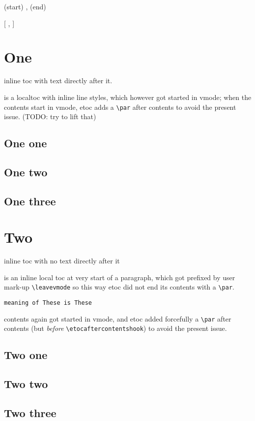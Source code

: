 \documentclass{article}
\begin{document}
  {(start) \etocskipfirstprefix}
  {, }
  {\etocname}
  {(end) }%

  { [\etocskipfirstprefix}
  {, }
  {\etocname}
  {]}%

\tableofcontents

\etocinline
\etocsettocstyle{}{}


\section{One}

inline toc \localtableofcontents with text directly after it.

\medskip

\localtableofcontents is a localtoc with inline line styles, which however got
started in vmode; when the contents start in vmode, etoc adds a \verb|\par|
after contents to avoid the present issue. (TODO: try to lift that)

\subsection{One one}

\subsection{One two}

\subsection{One three}


\section{Two}

inline toc with no text directly after it \localtableofcontents

\medskip

\leavevmode
\localtableofcontents is an inline local toc at very start of a paragraph, which got
prefixed by user mark-up \verb|\leavevmode| so this way etoc did not end its
contents with a \verb|\par|.

\medskip

\def\etocaftercontentshook{These }

\texttt{meaning of \string\etocaftercontentshook is \meaning\etocaftercontentshook}

\localtableofcontents contents again got started in vmode, and etoc added
forcefully a \verb|\par| after contents (but \emph{before}
\verb|\etocaftercontentshook|) to avoid the present issue.

\subsection{Two one}

\subsection{Two two}

\subsection{Two three}
\end{document}
